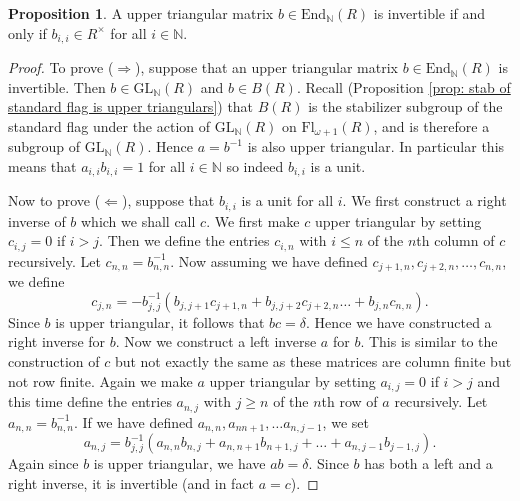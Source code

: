 \documentclass[oneside,11pt]{amsart}
\newcommand{\hilight}[1]{\colorbox{yellow}{#1}}
\newcommand{\nn}{\ensuremath{\mathbb{N}}}
\newcommand{\GL}{\ensuremath{\text{GL}}}
\newcommand{\Fl}{\ensuremath{\text{Fl}}}
\newcommand{\End}{\ensuremath{\text{End}}}
\theoremstyle{definition}
\newtheorem{proof techniques}{Proof Techniques}
\newtheorem{proposition}{Proposition}
\begin{document}

\begin{proposition}\label{prop: invertible upper triangulars}
A upper triangular matrix $b \in \End_\nn(R)$ is invertible if and only if $b_{i ,i} \in R^\times$ for all $i \in \nn$. 
\end{proposition}

\begin{proof}
To prove ($\Rightarrow$), suppose that an upper triangular matrix $b \in \End_\nn(R)$ is invertible. Then $b \in \GL_\nn(R)$ and $b \in B(R)$. Recall (Proposition \ref{prop: stab of standard flag is upper triangulars}) that $B(R)$ is the stabilizer subgroup of the standard flag under the action of $\GL_\nn(R)$ on $\Fl_{\omega + 1}(R)$, and is therefore a subgroup of $\GL_\nn(R)$. Hence $a = b^{-1}$ is also upper triangular. In particular this means that $a_{i , i} b_{i , i} = 1$ for all $i \in \nn$ so indeed $b_{i , i}$ is a unit. 

Now to prove ($\Leftarrow$), suppose that $b_{i , i}$ is a unit for all $i$. We first construct a right inverse of $b$ which we shall call $c$. We first make $c$ upper triangular by setting $c_{i , j} = 0$ if $i > j$. Then we define the entries $c_{i , n}$ with $i \leq n$ of the $n$th column of $c$ recursively. Let $c_{n , n} = b_{n , n}^{-1}$. Now assuming we have defined $c_{j + 1, n}, c_{j + 2, n} , \ldots, c_{n , n}$, we define 
\begin{equation*}
c_{j , n} = - b_{j , j}^{-1} ( b_{j, j + 1} c_{j + 1 , n} + b_{j , j + 2} c_{j + 2 , n} \ldots +  b_{j , n}  c_{n , n} ). 
\end{equation*}
Since $b$ is upper triangular, it follows that $bc = \delta$. Hence we have constructed a right inverse for $b$. 
Now we construct a left inverse $a$ for $b$. This is similar to the construction of $c$ but not exactly the same as these matrices are column finite but not row finite. Again we make $a$ upper triangular by setting $a_{i , j} = 0$ if $i > j$ and this time define the entries $a_{n , j}$ with $j \geq n$ of the $n$th row of $a$ recursively. Let $a_{n , n} = b_{n , n}^{-1}$. If we have defined $a_{n , n}, a_{n  n + 1}, \ldots a_{n , j - 1}$, we set 
\begin{equation*}
a_{n , j } = b_{j , j}^{-1} (a_{n , n} b_{n , j} + a_{n, n + 1} b_{n + 1 , j} + \ldots + a_{n , j - 1 } b_{j - 1 , j} ). 
\end{equation*}
Again since $b$ is upper triangular, we have $ab = \delta$. Since $b$ has both a left and a right inverse, it is invertible (and in fact $a = c$). 
\end{proof}
\end{document}
